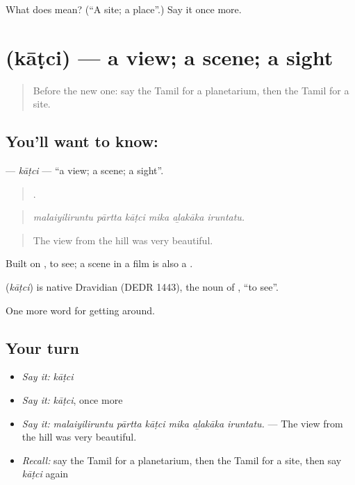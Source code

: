 \begin{tcolorbox}[breakable,colback=teal!4,colframe=teal!35!black,title={Before you move on}]
What does  mean? (\textquotedblleft{}A site; a place\textquotedblright{}.) Say it once more.
\end{tcolorbox}
\section[\texorpdfstring{\ta{காட்சி} (kāṭci)}{காட்சி (kāṭci)}]{ (kāṭci) — a view; a scene; a sight}

\label{lesson:TA-C425-katci}



\begin{quote}
Before the new one: say the Tamil for a planetarium, then the Tamil for a site.
\end{quote}

\subsection*{You'll want to know: }
\textbf{} — \emph{kāṭci} — \textquotedblleft{}a view; a scene; a sight\textquotedblright{}.

\begin{quote}
     .
\end{quote}

\begin{quote}
\emph{malaiyiliruntu pārtta kāṭci mika aḻakāka iruntatu.}
\end{quote}

\begin{quote}
The view from the hill was very beautiful.
\end{quote}

Built on , to see; a scene in a film is also a .

\begin{cousinweb}
\textbf{} (\emph{kāṭci}) is native Dravidian (DEDR 1443), the noun of , \textquotedblleft{}to see\textquotedblright{}.
\end{cousinweb}

\begin{grammarlens}[title={What you've built}]
One more word for getting around.
\end{grammarlens}

\subsection*{Your turn}
\begin{itemize}
\raggedright
  \item \emph{Say it:} \emph{kāṭci}
  \item \emph{Say it:} \emph{kāṭci}, once more
  \item \emph{Say it:} \emph{malaiyiliruntu pārtta kāṭci mika aḻakāka iruntatu.} — The view from the hill was very beautiful.
  \item \emph{Recall:} say the Tamil for a planetarium, then the Tamil for a site, then say \emph{kāṭci} again
\end{itemize}

